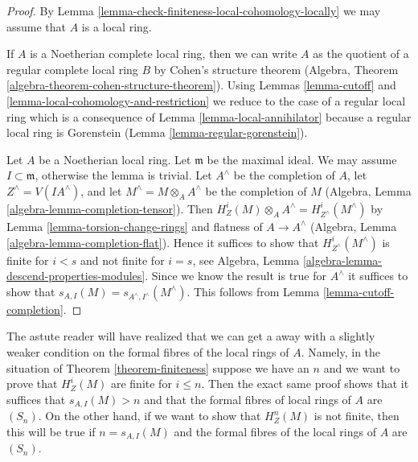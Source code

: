 \begin{proof}
By Lemma \ref{lemma-check-finiteness-local-cohomology-locally}
we may assume that $A$ is a local ring.

\medskip\noindent
If $A$ is a Noetherian complete local ring, then we can write $A$
as the quotient of a regular complete local ring $B$ by
Cohen's structure theorem
(Algebra, Theorem \ref{algebra-theorem-cohen-structure-theorem}).
Using Lemmas \ref{lemma-cutoff} and
\ref{lemma-local-cohomology-and-restriction}
we reduce to the case
of a regular local ring which is a consequence of
Lemma \ref{lemma-local-annihilator}
because a regular local ring is Gorenstein
(Lemma \ref{lemma-regular-gorenstein}).

\medskip\noindent
Let $A$ be a Noetherian local ring. Let $\mathfrak m$ be the maximal ideal.
We may assume $I \subset \mathfrak m$, otherwise the lemma is trivial.
Let $A^\wedge$ be the completion of $A$, let $Z^\wedge = V(IA^\wedge)$, and
let $M^\wedge = M \otimes_A A^\wedge$ be the completion of $M$
(Algebra, Lemma \ref{algebra-lemma-completion-tensor}).
Then $H^i_Z(M) \otimes_A A^\wedge = H^i_{Z^\wedge}(M^\wedge)$ by
Lemma \ref{lemma-torsion-change-rings} and flatness of $A \to A^\wedge$
(Algebra, Lemma \ref{algebra-lemma-completion-flat}).
Hence it suffices to show that $H^i_{Z^\wedge}(M^\wedge)$ is
finite for $i < s$ and not finite for $i = s$, see
Algebra, Lemma \ref{algebra-lemma-descend-properties-modules}.
Since we know the result is true for $A^\wedge$ it suffices
to show that $s_{A, I}(M) = s_{A^\wedge, I^\wedge}(M^\wedge)$.
This follows from Lemma \ref{lemma-cutoff-completion}.
\end{proof}

\begin{remark}
\label{remark-astute-reader}
The astute reader will have realized that we can get a away with a
slightly weaker condition on the formal fibres of the local rings
of $A$. Namely, in the situation of Theorem \ref{theorem-finiteness}
suppose we have an $n$ and we want to prove that
$H^i_Z(M)$ are finite for $i \leq n$. Then the exact same proof
shows that it suffices that $s_{A, I}(M) > n$ and that
the formal fibres of local rings of $A$ are $(S_n)$.
On the other hand, if we want to show that $H^n_Z(M)$
is not finite, then this will be true if $n = s_{A, I}(M)$
and the formal fibres of the local rings of $A$ are $(S_n)$.
\end{remark}







